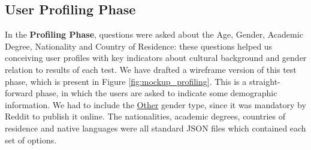 \subsection{User Profiling Phase}
\label{subsec:design_profiling}
%
In the \textbf{Profiling Phase}, questions were asked about the Age, Gender, Academic Degree, Nationality and Country of Residence: these
questions helped us conceiving user profiles with key indicators about cultural background and gender relation to results of each test.
%
We have drafted a wireframe version of this test phase, which is present in Figure \ref{fig:mockup_profiling}. This is a straight-forward
phase, in which the users are asked to indicate some demographic information. We had to include the \ul{Other} gender type, since it was
mandatory by Reddit to publish it online. The nationalities, academic degrees, countries of residence and native languages were all standard
JSON files which contained each set of options. \par
%
